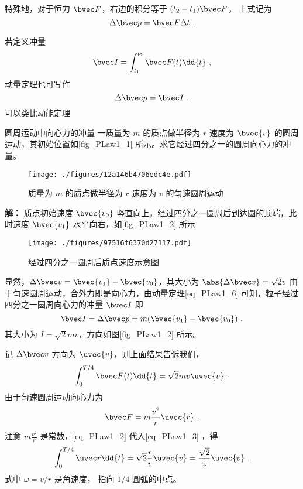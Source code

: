 特殊地，对于恒力 $\bvec F$，右边的积分等于 $(t_2-t_1)\bvec F$， 上式记为
\begin{equation}\label{eq_PLaw1_1}
\Delta \bvec p = \bvec F \Delta t~.
\end{equation}

若定义冲量
\begin{equation}
\bvec I=\int_{t_1}^{t_2}\bvec F(t) \dd{t}~,
\end{equation}
动量定理也可写作
\begin{equation}
\Delta \bvec p = \bvec I~.
\end{equation}
可以类比动能定理

\begin{example}{圆周运动中向心力的冲量}
一质量为 $m$ 的质点做半径为 $r$ 速度为 $\bvec{v}$ 的圆周运动，其初始位置如\autoref{fig_PLaw1_1} 所示。求它经过四分之一的圆周向心力的冲量。
\begin{figure}[ht]
\centering
\texttt{[image: ./figures/12a146b4706edc4e.pdf]}
\caption{质量为 $m$ 的质点做半径为 $r$ 速度为 $v$ 的匀速圆周运动} \label{fig_PLaw1_1}
\end{figure}
\textbf{解：} 质点初始速度 $\bvec{v_0}$ 竖直向上，经过四分之一圆周后到达圆的顶端，此时速度 $\bvec{v_1}$ 水平向右，如\autoref{fig_PLaw1_2} 所示
\begin{figure}[ht]
\centering
\texttt{[image: ./figures/97516f6370d27117.pdf]}
\caption{经过四分之一圆周后质点速度示意图} \label{fig_PLaw1_2}
\end{figure}
显然，$\Delta\bvec v=\bvec{v_1}-\bvec{v_0}$，其大小为 $\abs{\Delta\bvec v}=\sqrt{2}v$ 由于匀速圆周运动，合外力即是向心力，由动量定理\autoref{eq_PLaw1_6}  可知，粒子经过四分之一圆周向心力的冲量 $\bvec I$ 即
\begin{equation}
\bvec I=\Delta\bvec p=m(\bvec{v_1}-\bvec{v_0})~.
\end{equation}
其大小为 $I=\sqrt{2}mv$，方向如图\autoref{fig_PLaw1_2} 所示。

记 $\Delta\bvec v$ 方向为 $\uvec{v}$，则上面结果告诉我们，
\begin{equation}\label{eq_PLaw1_3}
\int_{0}^{T/4}\bvec F(t) \dd{t}=\sqrt{2}mv\uvec{v}~.
\end{equation}
由于匀速圆周运动向心力为
\begin{equation}\label{eq_PLaw1_2}
\bvec F=m\frac{v^2}{r}\uvec{r}~.
\end{equation}
注意 $m\frac{v^2}{r}$ 是常数，\autoref{eq_PLaw1_2} 代入\autoref{eq_PLaw1_3} ，得
\begin{equation}\label{eq_PLaw1_5}
\int_{0}^{T/4}\uvec r \dd{t}=\sqrt{2}\frac{r}{v}\uvec{v}=\frac{\sqrt{2}}{\omega}\uvec{v}~.
\end{equation}
式中 $\omega={v}/{r}$ 是角速度， 指向 $1/4$ 圆弧的中点。


\end{example}
